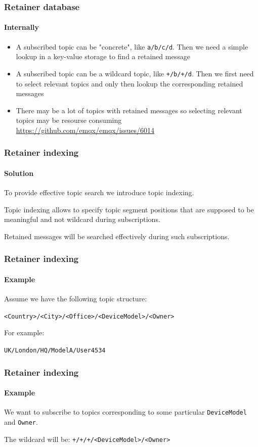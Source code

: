 \documentclass{beamer}
\begin{document}
\begin{frame}
    \frametitle{Retainer database}
    \framesubtitle{Internally}

    \begin{itemize}
        \item A subscribed topic can be "concrete", like \lstinline{a/b/c/d}.
        Then we need a simple lookup in a key-value storage to find a retained message
        \item A subscribed topic can be a wildcard topic, like \lstinline{+/b/+/d}. Then
        we first need to select relevant topics and only
        then lookup the corresponding retained messages
        \item There may be a lot of topics with retained messages so selecting relevant
        topics may be resourse consuming
        \href{https://github.com/emqx/emqx/issues/6014}{https://github.com/emqx/emqx/issues/6014}
    \end{itemize}
\end{frame}

\begin{frame}
    \frametitle{Retainer indexing}
    \framesubtitle{Solution}

    To provide effective topic search we introduce topic indexing.

    Topic indexing allows to specify topic segment positions that are supposed
    to be meaningful and not wildcard during subscriptions.

    Retained messages will be searched effectively during such subscriptions.
\end{frame}

\begin{frame}
    \frametitle{Retainer indexing}
    \framesubtitle{Example}

    Assume we have the following topic structure:

    \lstinline{<Country>/<City>/<Office>/<DeviceModel>/<Owner>}

    \vspace{1cm}

    For example:

    \lstinline{UK/London/HQ/ModelA/User4534}

\end{frame}

\begin{frame}
    \frametitle{Retainer indexing}
    \framesubtitle{Example}

    We want to subscribe to topics corresponding to some particular
    \lstinline{DeviceModel} and \lstinline{Owner}.

    \vspace{1cm}

    The wildcard will be:
    \lstinline{+/+/+/<DeviceModel>/<Owner>}
\end{frame}
\end{document}
